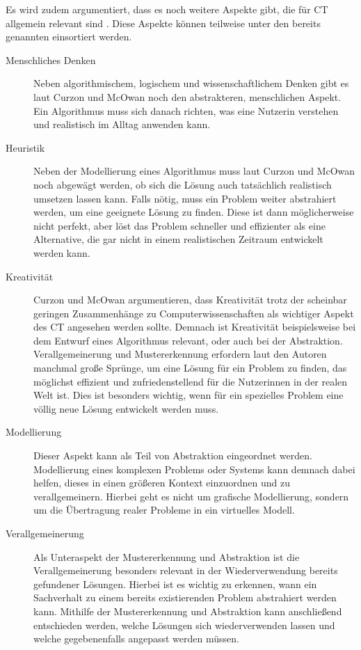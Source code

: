 Es wird zudem argumentiert, dass es noch weitere Aspekte gibt, die für CT allgemein relevant sind \cite{curzon}. Diese Aspekte können teilweise unter den bereits genannten einsortiert werden.

\begin{description}
    \item[Menschliches Denken] Neben algorithmischem, logischem und wissenschaftlichem Denken gibt es laut Curzon und McOwan \cite{curzon} noch den abstrakteren, menschlichen Aspekt. Ein Algorithmus muss sich danach richten, was eine Nutzerin verstehen und realistisch im Alltag anwenden kann.
    \item[Heuristik] Neben der Modellierung eines Algorithmus muss laut Curzon und McOwan noch abgewägt werden, ob sich die Lösung auch tatsächlich realistisch umsetzen lassen kann. Falls nötig, muss ein Problem weiter abstrahiert werden, um eine geeignete Lösung zu finden. Diese ist dann möglicherweise nicht perfekt, aber löst das Problem schneller und effizienter als eine Alternative, die gar nicht in einem realistischen Zeitraum entwickelt werden kann.
    \item[Kreativität] Curzon und McOwan argumentieren, dass Kreativität trotz der scheinbar geringen Zusammenhänge zu Computerwissenschaften als wichtiger Aspekt des CT angesehen werden sollte. Demnach ist Kreativität beispielsweise bei dem Entwurf eines Algorithmus relevant, oder auch bei der Abstraktion. Verallgemeinerung und Mustererkennung erfordern laut den Autoren manchmal große Sprünge, um eine Lösung für ein Problem zu finden, das möglichst effizient und zufriedenstellend für die Nutzerinnen in der realen Welt ist. Dies ist besonders wichtig, wenn für ein spezielles Problem eine völlig neue Lösung entwickelt werden muss.
    \item[Modellierung] Dieser Aspekt kann als Teil von Abstraktion eingeordnet werden. Modellierung eines komplexen Problems oder Systems kann demnach dabei helfen, dieses in einen größeren Kontext einzuordnen und zu verallgemeinern. Hierbei geht es nicht um grafische Modellierung, sondern um die Übertragung realer Probleme in ein virtuelles Modell.
    \item[Verallgemeinerung] Als Unteraspekt der Mustererkennung und Abstraktion ist die Verallgemeinerung besonders relevant in der Wiederverwendung bereits gefundener Lösungen. Hierbei ist es wichtig zu erkennen, wann ein Sachverhalt zu einem bereits existierenden Problem abstrahiert werden kann. Mithilfe der Mustererkennung und Abstraktion kann anschließend entschieden werden, welche Lösungen sich wiederverwenden lassen und welche gegebenenfalls angepasst werden müssen.

\end{description}
